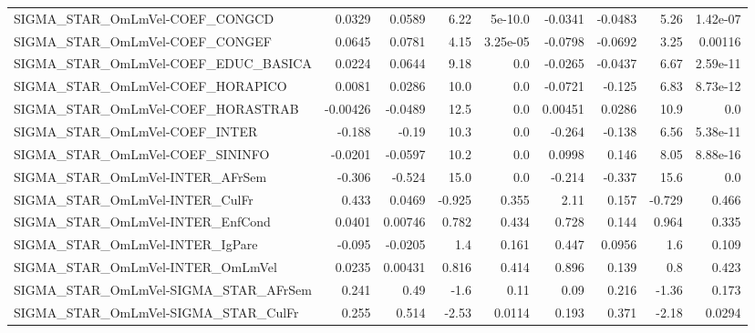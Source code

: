 \begin{tabular}{lrrrrrrrr}
SIGMA\_STAR\_OmLmVel-COEF\_CONGCD        &      0.0329 &       0.0589 &    6.22 &  5e-10.0 &    -0.0341 &     -0.0483 &         5.26 &      1.42e-07 \\
SIGMA\_STAR\_OmLmVel-COEF\_CONGEF        &      0.0645 &       0.0781 &    4.15 & 3.25e-05 &    -0.0798 &     -0.0692 &         3.25 &       0.00116 \\
SIGMA\_STAR\_OmLmVel-COEF\_EDUC\_BASICA   &      0.0224 &       0.0644 &    9.18 &      0.0 &    -0.0265 &     -0.0437 &         6.67 &      2.59e-11 \\
SIGMA\_STAR\_OmLmVel-COEF\_HORAPICO      &      0.0081 &       0.0286 &    10.0 &      0.0 &    -0.0721 &      -0.125 &         6.83 &      8.73e-12 \\
SIGMA\_STAR\_OmLmVel-COEF\_HORASTRAB     &    -0.00426 &      -0.0489 &    12.5 &      0.0 &    0.00451 &      0.0286 &         10.9 &           0.0 \\
SIGMA\_STAR\_OmLmVel-COEF\_INTER         &      -0.188 &        -0.19 &    10.3 &      0.0 &     -0.264 &      -0.138 &         6.56 &      5.38e-11 \\
SIGMA\_STAR\_OmLmVel-COEF\_SININFO       &     -0.0201 &      -0.0597 &    10.2 &      0.0 &     0.0998 &       0.146 &         8.05 &      8.88e-16 \\
SIGMA\_STAR\_OmLmVel-INTER\_AFrSem       &      -0.306 &       -0.524 &    15.0 &      0.0 &     -0.214 &      -0.337 &         15.6 &           0.0 \\
SIGMA\_STAR\_OmLmVel-INTER\_CulFr        &       0.433 &       0.0469 &  -0.925 &    0.355 &       2.11 &       0.157 &       -0.729 &         0.466 \\
SIGMA\_STAR\_OmLmVel-INTER\_EnfCond      &      0.0401 &      0.00746 &   0.782 &    0.434 &      0.728 &       0.144 &        0.964 &         0.335 \\
SIGMA\_STAR\_OmLmVel-INTER\_IgPare       &      -0.095 &      -0.0205 &     1.4 &    0.161 &      0.447 &      0.0956 &          1.6 &         0.109 \\
SIGMA\_STAR\_OmLmVel-INTER\_OmLmVel      &      0.0235 &      0.00431 &   0.816 &    0.414 &      0.896 &       0.139 &          0.8 &         0.423 \\
SIGMA\_STAR\_OmLmVel-SIGMA\_STAR\_AFrSem  &       0.241 &         0.49 &    -1.6 &     0.11 &       0.09 &       0.216 &        -1.36 &         0.173 \\
SIGMA\_STAR\_OmLmVel-SIGMA\_STAR\_CulFr   &       0.255 &        0.514 &   -2.53 &   0.0114 &      0.193 &       0.371 &        -2.18 &        0.0294 \\

\end{tabular}
